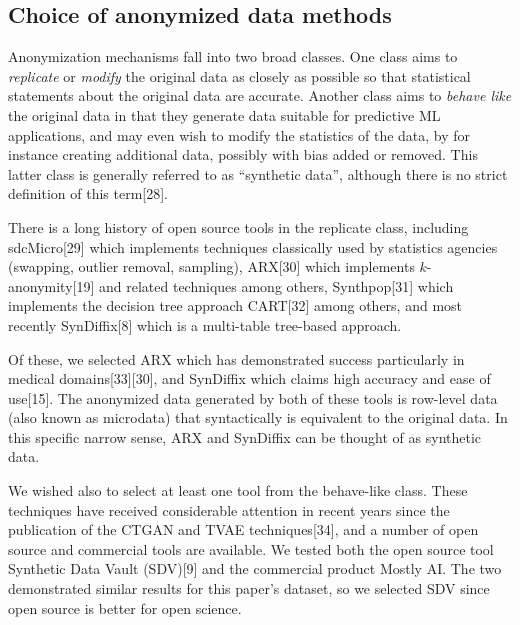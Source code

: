 \documentclass[10pt]{article}
\newcommand{\mycite}[1]{[#1]}
\begin{document}
\subsection*{Choice of anonymized data methods}

Anonymization mechanisms fall into two broad classes. One class aims to \textit{replicate} or \textit{modify} the original data as closely as possible so that statistical statements about the original data are accurate. Another class aims to \textit{behave like} the original data in that they generate data suitable for predictive ML applications, and may even wish to modify the statistics of the data, by for instance creating additional data, possibly with bias added or removed. This latter class is generally referred to as ``synthetic data'', although there is no strict definition of this term\mycite{28}.

There is a long history of open source tools in the replicate class, including sdcMicro\mycite{29} which implements techniques classically used by statistics agencies (swapping, outlier removal, sampling),  ARX\mycite{30} which implements $k$-anonymity\mycite{19} and related techniques among others, Synthpop\mycite{31} which implements the decision tree approach CART\mycite{32} among others, and most recently SynDiffix\mycite{8} which is a multi-table tree-based approach.

Of these, we selected ARX which has demonstrated success particularly in medical domains\mycite{33}\mycite{30}, and SynDiffix which claims high accuracy and ease of use\mycite{15}. The anonymized data generated by both of these tools is row-level data (also known as microdata) that syntactically is equivalent to the original data. In this specific narrow sense, ARX and SynDiffix can be thought of as synthetic data.


We wished also to select at least one tool from the behave-like class. These techniques have received considerable attention in recent years since the publication of the CTGAN and TVAE techniques\mycite{34}, and a number of open source and commercial tools are available. We tested both the open source tool Synthetic Data Vault (SDV)\mycite{9} and the commercial product Mostly AI. The two demonstrated similar results for this paper's dataset, so we selected SDV since open source is better for open science.
\end{document}
